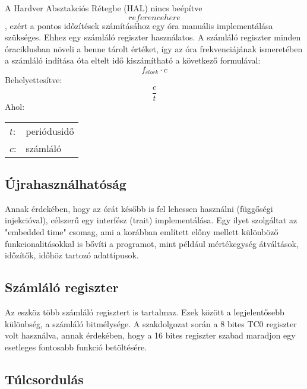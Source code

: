 \label{ora}

A Hardver Absztakciós Rétegbe (HAL) nincs beépítve \[reference here\], ezért a pontos időzítések számításához egy óra manuális implementálása szükséges.
Ehhez egy számláló regiszter használatos. A számláló regiszter minden óraciklusban növeli a benne tárolt értéket, így az óra frekvenciájának ismeretében a számláló indítása óta eltelt idő kiszámítható a következő formulával: \[f_{clock} \cdot c\]
Behelyettesítve:\[\frac{c}{t}\]
Ahol:
\captionsetup[table]{list=no}
\begin{table}[H]
    \begin{tabular}{ll}
    $t$:    &periódusidő \\
    $c$:    &számláló
    \end{tabular}
\end{table}	
\captionsetup[table]{list=yes}

\subsection{Újrahasználhatóság}

Annak érdekében, hogy az órát később is fel lehessen használni (függőségi injekcióval), célszerű egy interfész (trait) implementálása. Egy ilyet szolgáltat az "embedded time" csomag, ami a korábban említett előny mellett különböző funkcionalitásokkal is bővíti a programot, mint például mértékegység átváltások, időzítők, időhöz tartozó adattípusok.

\subsection{Számláló regiszter}

Az eszköz több számláló regisztert is tartalmaz. Ezek között a legjelentősebb különbség, a számláló bitmélysége.
A szakdolgozat során a 8 bites TC0 regiszter volt használva, annak érdekében, hogy a 16 bites regiszter szabad maradjon egy esetleges fontosabb funkció betöltésére.

\subsection{Túlcsordulás}

